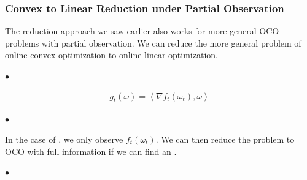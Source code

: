 \documentclass{article}
\begin{document}
\subsubsection{Convex to Linear Reduction under Partial Observation}
The reduction approach we saw earlier also works for more general OCO problems with partial observation. We can reduce the more general problem of online convex optimization to online linear optimization. 

$\bullet$ 

\begin{align*}
g_{t}(\omega)=\left\langle\nabla f_{t}\left(\omega_{t}\right), \omega\right\rangle
\end{align*}

$\bullet$ 

In the case of , we only observe $f_{t}\left(\omega_{t}\right)$. We can then reduce the problem to OCO with full information if we can find an .

$\bullet$ 
\end{document}
